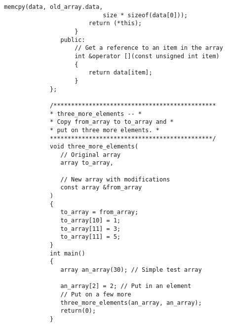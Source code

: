 \begin{LTR}
\begin{lstlisting}[style=C++Style]
             			memcpy(data, old_array.data,
             				size * sizeof(data[0]));
             			return (*this);
             		}
             	public:
             		// Get a reference to an item in the array
             		int &operator [](const unsigned int item)
             		{
             			return data[item];
             		}
             };

             /**********************************************
             * three_more_elements -- *
             * Copy from_array to to_array and *
             * put on three more elements. *
             **********************************************/
             void three_more_elements(
             	// Original array
             	array to_array,

             	// New array with modifications
             	const array &from_array
             )
             {
             	to_array = from_array;
             	to_array[10] = 1;
             	to_array[11] = 3;
             	to_array[11] = 5;
             }
             int main()
             {
             	array an_array(30); // Simple test array

             	an_array[2] = 2; // Put in an element
             	// Put on a few more
             	three_more_elements(an_array, an_array);
             	return(0);
             }
        \end{lstlisting}
\end{LTR}